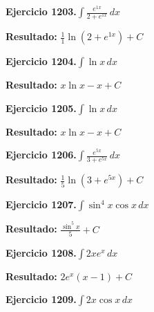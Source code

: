 \documentclass[10pt,a4paper]{article}
\begin{document}
\begin{ejbox}
\textbf{Ejercicio 1203.}\quad $\int \frac{e^{1x}}{2+e^{1x}}\,dx$
\end{ejbox}

\begin{solbox}
\textbf{Resultado:} \(\displaystyle \frac{1}{1}\ln(2+e^{1x}) + C\)
\end{solbox}

\newpage
\begin{ejbox}
\textbf{Ejercicio 1204.}\quad $\int \ln x\,dx$
\end{ejbox}

\begin{solbox}
\textbf{Resultado:} \(\displaystyle x\ln x - x + C\)
\end{solbox}

\begin{ejbox}
\textbf{Ejercicio 1205.}\quad $\int \ln x\,dx$
\end{ejbox}

\begin{solbox}
\textbf{Resultado:} \(\displaystyle x\ln x - x + C\)
\end{solbox}

\begin{ejbox}
\textbf{Ejercicio 1206.}\quad $\int \frac{e^{5x}}{3+e^{5x}}\,dx$
\end{ejbox}

\begin{solbox}
\textbf{Resultado:} \(\displaystyle \frac{1}{5}\ln(3+e^{5x}) + C\)
\end{solbox}

\newpage
\begin{ejbox}
\textbf{Ejercicio 1207.}\quad $\int \sin^{4}x \cos x\,dx$
\end{ejbox}

\begin{solbox}
\textbf{Resultado:} \(\displaystyle \frac{\sin^{5}x}{5} + C\)
\end{solbox}

\begin{ejbox}
\textbf{Ejercicio 1208.}\quad $\int 2x e^{x}\,dx$
\end{ejbox}

\begin{solbox}
\textbf{Resultado:} \(\displaystyle 2e^x(x-1) + C\)
\end{solbox}

\begin{ejbox}
\textbf{Ejercicio 1209.}\quad $\int 2x \cos x\,dx$
\end{ejbox}
\end{document}
